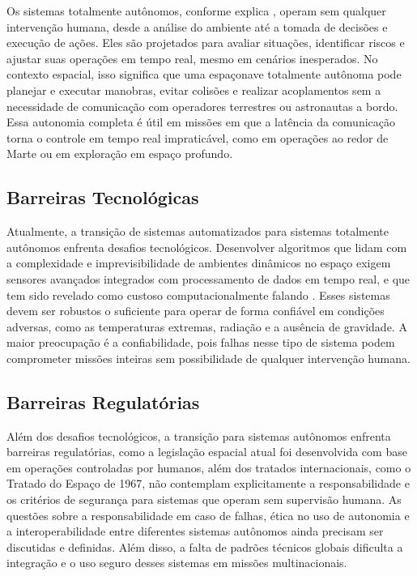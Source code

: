 Os sistemas totalmente autônomos, conforme explica \cite{ibmAutomation}, operam sem qualquer intervenção humana, desde a análise do ambiente até a tomada de decisões e execução de ações.
Eles são projetados para avaliar situações, identificar riscos e ajustar suas operações em tempo real, mesmo em cenários inesperados.
No contexto espacial, isso significa que uma espaçonave totalmente autônoma pode planejar e executar manobras, evitar colisões e realizar acoplamentos sem a necessidade de comunicação com operadores terrestres ou astronautas a bordo.
Essa autonomia completa é útil em missões em que a latência da comunicação torna o controle em tempo real impraticável, como em operações ao redor de Marte ou em exploração em espaço profundo.

\subsection{Barreiras Tecnológicas}

Atualmente, a transição de sistemas automatizados para sistemas totalmente autônomos enfrenta desafios tecnológicos.
Desenvolver algoritmos que lidam com a complexidade e imprevisibilidade de ambientes dinâmicos no espaço exigem sensores avançados integrados com processamento de dados em tempo real, e que tem sido revelado como custoso computacionalmente falando \cite{ainowComputeAI}.
Esses sistemas devem ser robustos o suficiente para operar de forma confiável em condições adversas, como as temperaturas extremas, radiação e a ausência de gravidade.
A maior preocupação é a confiabilidade, pois falhas nesse tipo de sistema podem comprometer missões inteiras sem possibilidade de qualquer intervenção humana.

\subsection{Barreiras Regulatórias}

Além dos desafios tecnológicos, a transição para sistemas autônomos enfrenta barreiras regulatórias, como a legislação espacial atual foi desenvolvida com base em operações controladas por humanos, além dos tratados internacionais, como o Tratado do Espaço de 1967, não contemplam explicitamente a responsabilidade e os critérios de segurança para sistemas que operam sem supervisão humana.
As questões sobre a responsabilidade em caso de falhas, ética no uso de autonomia \cite{ainowComputeAI} e a interoperabilidade entre diferentes sistemas autônomos ainda precisam ser discutidas e definidas.
Além disso, a falta de padrões técnicos globais dificulta a integração e o uso seguro desses sistemas em missões multinacionais.

